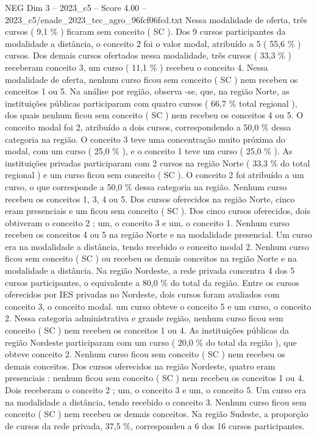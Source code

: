 \begin{textsample}{NEG Dim 3 – 2023\_c5 – Score 4.00 – 2023\_c5/enade\_2023\_tec\_agro\_96fcf06fcd.txt}
Nessa modalidade de oferta, três cursos ( 9,1 \% ) ficaram sem conceito ( SC ).
Dos 9 cursos participantes da modalidade a distância, o conceito 2 foi o valor modal, atribuído a 5 ( 55,6 \% ) cursos.
Dos demais cursos ofertados nessa modalidade, três cursos ( 33,3 \% ) receberam conceito 3, um curso ( 11,1 \% ) recebeu o conceito 4.
Nessa modalidade de oferta, nenhum curso ficou sem conceito ( SC ) nem recebeu os conceitos 1 ou 5.
Na análise por região, observa -se, que, na região Norte, as instituições públicas participaram com quatro cursos ( 66,7 \% total regional ), dos quais nenhum ficou sem conceito ( SC ) nem recebeu os conceitos 4 ou 5.
O conceito modal foi 2, atribuído a dois cursos, correspondendo a 50,0 \% dessa categoria na região.
O conceito 3 teve uma concentração muito próxima do modal, com um curso ( 25,0 \% ), e o conceito 1 teve um curso ( 25,0 \% ).
As instituições privadas participaram com 2 cursos na região Norte ( 33,3 \% do total regional ) e um curso ficou sem conceito ( SC ).
O conceito 2 foi atribuído a um curso, o que corresponde a 50,0 \% dessa categoria na região.
Nenhum curso recebeu os conceitos 1, 3, 4 ou 5.
Dos cursos oferecidos na região Norte, cinco eram presenciais e um ficou sem conceito ( SC ).
Dos cinco cursos oferecidos, dois obtiveram o conceito 2 ; um, o conceito 3 e um, o conceito 1.
Nenhum curso recebeu os conceitos 4 ou 5 na região Norte e na modalidade presencial.
Um curso era na modalidade a distância, tendo recebido o conceito modal 2.
Nenhum curso ficou sem conceito ( SC ) ou recebeu os demais conceitos na região Norte e na modalidade a distância.
Na região Nordeste, a rede privada concentra 4 dos 5 cursos participantes, o equivalente a 80,0 \% do total da região.
Entre os cursos oferecidos por IES privadas no Nordeste, dois cursos foram avaliados com conceito 3, o conceito modal. um curso obteve o conceito 5 e um curso, o conceito 2.
Nessa categoria administrativa e grande região, nenhum curso ficou sem conceito ( SC ) nem recebeu os conceitos 1 ou 4.
As instituições públicas da região Nordeste participaram com um curso ( 20,0 \% do total da região ), que obteve conceito 2.
Nenhum curso ficou sem conceito ( SC ) nem recebeu os demais conceitos.
Dos cursos oferecidos na região Nordeste, quatro eram presenciais : nenhum ficou sem conceito ( SC ) nem recebeu os conceitos 1 ou 4.
Dois receberam o conceito 2 ; um, o conceito 3 e um, o conceito 5.
Um curso era na modalidade a distância, tendo recebido o conceito 3.
Nenhum curso ficou sem conceito ( SC ) nem recebeu os demais conceitos.
Na região Sudeste, a proporção de cursos da rede privada, 37,5 \%, correspondeu a 6 dos 16 cursos participantes.

\end{textsample}
